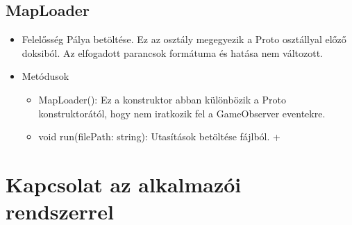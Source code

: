 \subsection{MapLoader}
\begin{itemize}
\item Felelősség\newline
Pálya betöltése. Ez az osztály megegyezik a Proto osztállyal előző doksiból. Az elfogadott parancsok formátuma és hatása nem változott.
\item Metódusok\newline
	\begin{itemize}
		\item MapLoader(): Ez a konstruktor abban különbözik a Proto konstruktorától, hogy nem iratkozik fel a GameObserver eventekre. 
		\item void run(filePath: string): Utasítások betöltése fájlból. +
	\end{itemize}
\end{itemize}

\section{Kapcsolat az alkalmazói rendszerrel}


